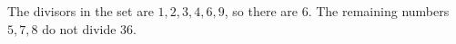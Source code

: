 The divisors in the set are $1,2,3,4,6,9$, so there are $\boxed{6}$. The remaining numbers $5,7,8$ do not divide $36$.

